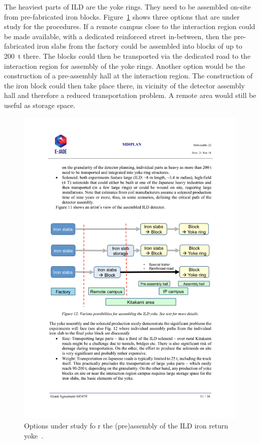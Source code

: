 The heaviest parts of ILD are the yoke rings. They need to be assembled on-site from pre-fabricated iron blocks. Figure~\ref{fig:integration:yoke_assembly} shows three options that are under study for the procedures. If a remote campus close to the interaction region could be made available, with a dedicated reinforced street in-between, then the pre-fabricated iron slabs from the factory could be assembled into blocks of up to 200~t there. The blocks could then be transported via the dedicated road to the interaction region for assembly of the yoke rings. Another option would be the construction of a pre-assembly hall at the interaction region. The construction of the iron block could then take place there, in vicinity of the detector assembly hall and therefore a reduced transportation problem. A remote area would still be useful as storage space.
\begin{figure}[h!]
\centering
\includegraphics[width=0.8\hsize]{Integration/fig/yoke_assembly.pdf}
\caption{\label{fig:integration:yoke_assembly}Options under study fo r the (pre)assembly of the ILD iron return yoke~\cite{ild:bib:ejade_mdi}.}
\end{figure}

